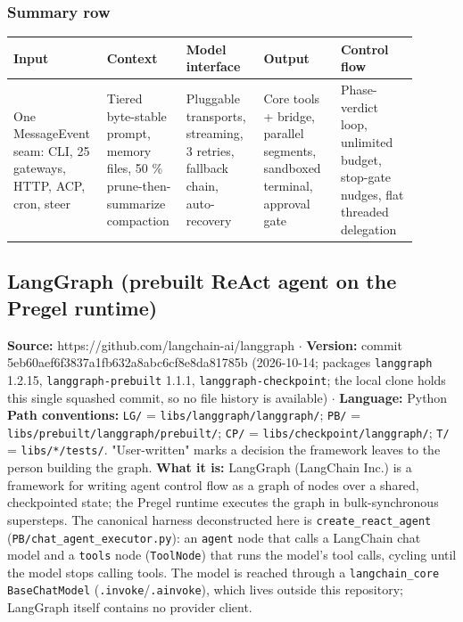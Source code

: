 \subsubsection*{Summary row}
\begin{longtable}{@{}p{0.18\linewidth}p{0.18\linewidth}p{0.18\linewidth}p{0.18\linewidth}p{0.18\linewidth}@{}}
\toprule \textbf{Input} & \textbf{Context} & \textbf{Model interface} & \textbf{Output} & \textbf{Control flow} \\ \midrule \endhead
One MessageEvent seam: CLI, 25 gateways, HTTP, ACP, cron, steer & Tiered byte-stable prompt, memory files, 50 \% prune-then-summarize compaction & Pluggable transports, streaming, 3 retries, fallback chain, auto-recovery & Core tools + bridge, parallel segments, sandboxed terminal, approval gate & Phase-verdict loop, unlimited budget, stop-gate nudges, flat threaded delegation \\
\bottomrule \end{longtable}


\subsection{LangGraph (prebuilt ReAct agent on the Pregel runtime)}

\textbf{Source:} https://github.com/langchain-ai/langgraph $\cdot$ \textbf{Version:} commit 5eb60aef6f3837a1fb632a8abc6cf8e8da81785b (2026-10-14; packages \texttt{langgraph} 1.2.15, \texttt{langgraph-\allowbreak{}prebuilt} 1.1.1, \texttt{langgraph-\allowbreak{}checkpoint}; the local clone holds this single squashed commit, so no file history is available) $\cdot$ \textbf{Language:} Python
\textbf{Path conventions:} \texttt{LG/\allowbreak{}} = \texttt{libs/\allowbreak{}langgraph/\allowbreak{}langgraph/\allowbreak{}}; \texttt{PB/\allowbreak{}} = \texttt{libs/\allowbreak{}prebuilt/\allowbreak{}langgraph/\allowbreak{}prebuilt/\allowbreak{}}; \texttt{CP/\allowbreak{}} = \texttt{libs/\allowbreak{}checkpoint/\allowbreak{}langgraph/\allowbreak{}}; \texttt{T/\allowbreak{}} = \texttt{libs/\allowbreak{}*/\allowbreak{}tests/\allowbreak{}}. "User-written" marks a decision the framework leaves to the person building the graph.
\textbf{What it is:} LangGraph (LangChain Inc.) is a framework for writing agent control flow as a graph of nodes over a shared, checkpointed state; the Pregel runtime executes the graph in bulk-synchronous supersteps. The canonical harness deconstructed here is \texttt{create\_\allowbreak{}react\_\allowbreak{}agent} (\texttt{PB/\allowbreak{}chat\_\allowbreak{}agent\_\allowbreak{}executor.\allowbreak{}py}): an \texttt{agent} node that calls a LangChain chat model and a \texttt{tools} node (\texttt{ToolNode}) that runs the model's tool calls, cycling until the model stops calling tools. The model is reached through a \texttt{langchain\_\allowbreak{}core} \texttt{BaseChatModel} (\texttt{.\allowbreak{}invoke}/\texttt{.\allowbreak{}ainvoke}), which lives outside this repository; LangGraph itself contains no provider client.

